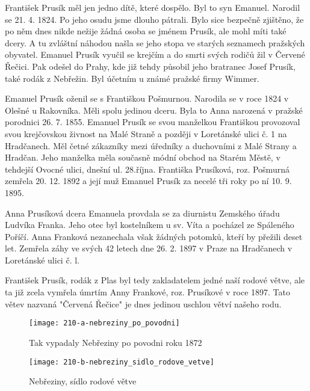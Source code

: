 \documentclass[../dejiny-rodu-prusiku.tex]{subfiles}
\begin{document}
František Prusík měl jen jedno dítě, které dospělo. Byl to syn Emanuel. Narodil se 21. 4. 1824. Po jeho osudu
jsme dlouho pátrali. Bylo sice bezpečně zjištěno, že po něm dnes nikde nežije žádná osoba se jménem Prusík, ale mohl míti také dcery. A tu zvláštní náhodou našla se jeho stopa ve starých seznamech pražských obyvatel. Emanuel Prusík vyučil se krejčím a do smrti svých rodičů žil v Červené Řečici. Pak odešel do Prahy, kde již tehdy působil jeho bratranec Josef Prusík, také rodák z Nebřežin. Byl účetním u známé pražské firmy Wimmer.

Emanuel Prusík oženil se s Františkou Pošmurnou. Narodila se v roce 1824 v Olešné u Rakovníka. Měli spolu jedinou dceru. Byla to Anna narozená v pražské porodnici 26. 7. 1855. Emanuel Prusík se svou manželkou Františkou provozoval svou krejčovskou živnost na Malé Straně a později v Loretánské ulici č. 1 na Hradča­nech. Měl četné zákazníky mezi úředníky a duchovními z Malé Strany a Hradčan. Jeho manželka měla současně módní obchod na Starém Městě, v tehdejší Ovocné ulici, dnešní ul. 28.října. Františka Prusíková, roz. Pošmurná zemřela 20. 12. 1892 a její muž Emanuel Prusík za nece­lé tři roky po ní 10. 9. 1895.

Anna Prusíková dcera Emanuela provdala se za diurnistu Zemského úřadu Ludvíka Franka. Jeho otec byl kostelní­kem u sv. Víta a pocházel ze Spáleného Poříčí. Anna Franková nezanechala však žádných potomků, kteří by přežili deset let. Zemřela záhy ve svých 42 letech dne 26. 2. 1897 v Praze na Hradčanech v Loretánské ulici č. l.

František Prusík, rodák z Plas byl tedy zakladatelem jedné naší rodové větve, ale ta již zcela vymřela úmrtím Anny Frankové, roz. Prusíkové v roce 1897. Tato větev nazvaná "Červená Řečice" je dnes jedinou uschlou větví našeho rodu.

\begin{figure}
\centering
\texttt{[image: 210-a-nebreziny\_po\_povodni]}
\caption{Tak vypadaly Nebřeziny po povodni roku 1872}
\label{fig:210-a-nebreziny_po_povodni}
\end{figure}

\begin{figure}
\centering
\texttt{[image: 210-b-nebreziny\_sidlo\_rodove\_vetve]}
\caption{Nebřeziny, sídlo rodové větve}
\label{fig:210-b-nebreziny_sidlo_rodove_vetve}
\end{figure}
\end{document}
